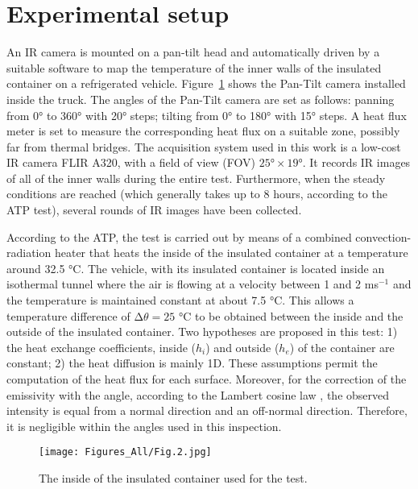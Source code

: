 \documentclass{tQRT2e}
\begin{document}
\section{Experimental setup}
An IR camera is mounted on a pan-tilt head and automatically driven by a suitable software to map the temperature of the inner walls of the insulated container on a refrigerated vehicle. Figure~\ref{Exp_setup} shows the Pan-Tilt camera installed inside the truck. The angles of the Pan-Tilt camera are set as follows: panning from 0° to 360° with 20° steps; tilting from 0° to 180° with 15° steps. A heat flux meter is set to measure the corresponding heat flux on a suitable zone, possibly far from thermal bridges. The acquisition system used in this work is a low-cost IR camera FLIR A320, with a field of view (FOV) $ 25°×19° $. It records IR images of all of the inner walls during the entire test. Furthermore, when the steady conditions are reached (which generally takes up to 8 hours, according to the ATP test), several rounds of IR images have been collected.

According to the ATP, the test is carried out by means of a combined convection-radiation heater that heats the inside of the insulated container at a temperature around 32.5 °C. The vehicle, with its insulated container is located inside an isothermal tunnel where the air is flowing at a velocity between 1 and 2 ms$^{−1}$ and the temperature is maintained constant at about 7.5 °C. This allows a temperature difference of $ ∆\theta  = 25 $ °C to be obtained between the inside and the outside of the insulated container. Two hypotheses are proposed in this test: 1) the heat exchange coefficients, inside ($ h_i $) and outside ($ h_e $) of the container are constant; 2) the heat diffusion is mainly 1D. These assumptions permit the computation of the heat flux for each surface. Moreover, for the correction of the emissivity with the angle, according to the Lambert cosine law \cite{dragano2009experimental,Hottel1967a}, the observed intensity is equal from a normal direction and an off-normal direction. Therefore, it is negligible within the angles used  in this inspection.
\begin{figure}[ht]
	\centering
	\texttt{[image: Figures\_All/Fig.2.jpg]}
	\caption{The inside of the insulated container used for the test.}
	\label{Exp_setup}
\end{figure}
\end{document}
